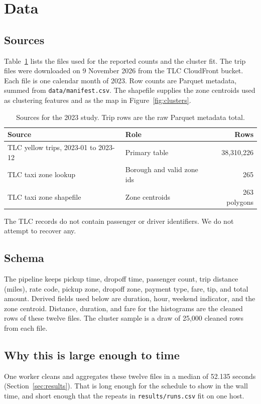 \documentclass[11pt,a4paper]{article}
\begin{document}
\section{Data}
\label{sec:data}

\subsection{Sources}
Table~\ref{tab:sources} lists the files used for the reported counts and the cluster fit. The trip files were downloaded on 9 November 2026 from the TLC CloudFront bucket. Each file is one calendar month of 2023. Row counts are Parquet metadata, summed from \texttt{data/manifest.csv}. The shapefile supplies the zone centroids used as clustering features and as the map in Figure~\ref{fig:clusters}.

\begin{table}[ht]
\centering
\caption{Sources for the 2023 study. Trip rows are the raw Parquet metadata total.}
\label{tab:sources}
\begin{tabular}{llr}
\toprule
Source & Role & Rows \\
\midrule
TLC yellow trips, 2023-01 to 2023-12 & Primary table & 38,310,226 \\
TLC taxi zone lookup & Borough and valid zone ids & 265 \\
TLC taxi zone shapefile & Zone centroids & 263 polygons \\
\bottomrule
\end{tabular}
\end{table}

The TLC records do not contain passenger or driver identifiers. We do not attempt to recover any.

\subsection{Schema}
The pipeline keeps pickup time, dropoff time, passenger count, trip distance (miles), rate code, pickup zone, dropoff zone, payment type, fare, tip, and total amount. Derived fields used below are duration, hour, weekend indicator, and the zone centroid. Distance, duration, and fare for the histograms are the cleaned rows of these twelve files. The cluster sample is a draw of 25{,}000 cleaned rows from each file.

\subsection{Why this is large enough to time}
One worker cleans and aggregates these twelve files in a median of 52.135 seconds (Section~\ref{sec:results}). That is long enough for the schedule to show in the wall time, and short enough that the repeats in \texttt{results/runs.csv} fit on one host.
\end{document}
